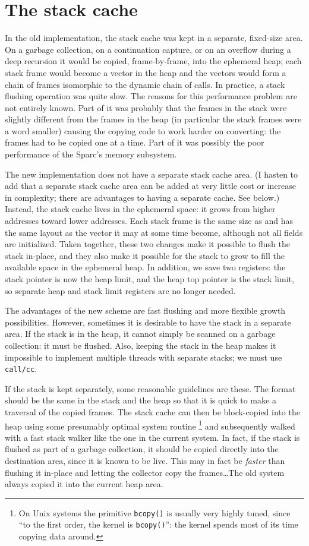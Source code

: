 \section{The stack cache}

In the old implementation, the stack cache was kept in a separate,
fixed-size area. On a garbage collection, on a continuation capture, or on
an overflow during a deep recursion it would be copied, frame-by-frame, into
the ephemeral heap; each stack frame would become a vector in the heap and
the vectors would form a chain of frames isomorphic to the dynamic chain of
calls.  In practice, a stack flushing operation was quite slow. The reasons
for this performance problem are not entirely known. Part of it was probably
that the frames in the stack were slightly different from the frames in the
heap (in particular the stack frames were a word smaller) causing the
copying code to work harder on converting: the frames had to be copied one
at a time.  Part of it was possibly the poor performance of the Sparc's
memory subsystem.

The new implementation does not have a separate stack cache area. (I hasten
to add that a separate stack cache area can be added at very little cost or
increase in complexity; there are advantages to having a separate cache. See
below.) Instead, the stack cache lives in the ephemeral space: it grows from
higher addresses toward lower addresses. Each stack frame is the same size as
and has the same layout as the vector it may at some time become, although not
all fields are initialized. Taken together, these two changes make it
possible to flush the stack in-place, and they also make it possible for the
stack to grow to fill the available space in the ephemeral heap. In
addition, we save two registers: the stack pointer is now the heap limit,
and the heap top pointer is the stack limit, so separate heap and stack
limit registers are no longer needed.

The advantages of the new scheme are fast flushing and more flexible growth
possibilities. However, sometimes it is desirable to have the stack in a
separate area. If the stack is in the heap, it cannot simply be scanned on a
garbage collection: it must be flushed. Also, keeping the stack in the heap
makes it impossible to implement multiple threads with separate stacks; we
must use {\tt call/cc}.

If the stack is kept separately, some reasonable guidelines are these. The
format should be the same in the stack and the heap so that it is quick to
make a traversal of the copied frames. The stack cache can then be
block-copied into the heap using some presumably optimal system routine%
\footnote{On Unix systems the primitive {\tt bcopy()} is usually very highly
tuned, since ``to the first order, the kernel is {\tt bcopy()}'': the kernel
spends most of its time copying data around.} and subsequently walked with a
fast stack walker like the one in the current system. In fact, if the stack
is flushed as part of a garbage collection, it should be copied directly
into the destination area, since it is known to be live. This may in fact be
{\em faster} than flushing it in-place and letting the collector copy the
frames\ldots The old system always copied it into the current heap area.

